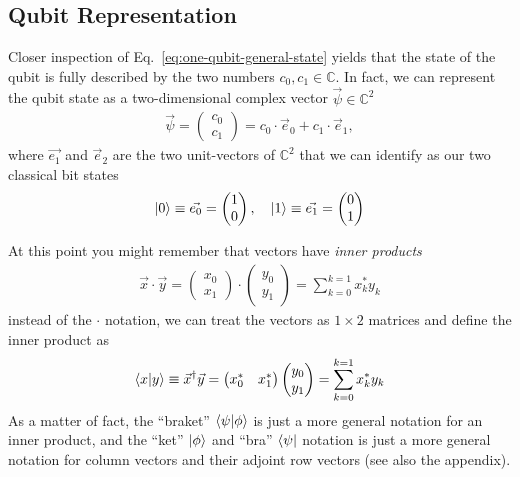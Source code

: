 \subsection{Qubit Representation}\label{sec:qubit-rep}
Closer inspection of Eq.~\eqref{eq:one-qubit-general-state} yields that the state of the qubit is fully described by the two numbers $c_0, c_1\in\mathbb{C}$. In fact, we can represent the qubit state as a two-dimensional complex vector $\Vec{\psi} \in \mathbb{C}^2$
\begin{align}
    \Vec{\psi} = \begin{pmatrix} c_0 \\ c_1 \end{pmatrix} = c_0 \cdot \Vec{e}_0 + c_1 \cdot \Vec{e}_1,
\end{align}
where $\Vec{e_1}$ and $\Vec{e}_2$ are the two unit-vectors of $\mathbb{C}^2$ that we can identify as our two classical bit states
\begin{align}
    \ket{0} \equiv \Vec{e_0} = \begin{pmatrix} 1\\0 \end{pmatrix}, \quad \ket{1} \equiv \Vec{e_1} = \begin{pmatrix} 0\\1 \end{pmatrix}
\end{align}


At this point you might remember that vectors have \textit{inner products}
\begin{align}
    \Vec{x}\cdot\Vec{y} = \begin{pmatrix} x_0\\x_1 \end{pmatrix} \cdot \begin{pmatrix} y_0\\y_1
    \end{pmatrix}  = \sum_{k=0}^{k=1} x_k^* y_k 
\end{align}
instead of the $\cdot$ notation, we can treat the vectors as $1\times 2$ matrices and define the inner product as
\begin{align}
    \braket{x}{y}\equiv \Vec{x}^\dagger \Vec{y}=\begin{pmatrix} x_0^* & x_1^* \end{pmatrix} \begin{pmatrix} y_0\\y_1
    \end{pmatrix}  = \sum_{k=0}^{k=1} x_k^* y_k 
\end{align}
As a matter of fact, the ``braket'' $\braket{\psi}{\phi}$ is just a more general notation for an inner product, and the ``ket'' $\ket{\phi}$ and ``bra'' $\bra{\psi}$ notation is just a more general notation for column vectors and their adjoint row vectors (see also the appendix).


